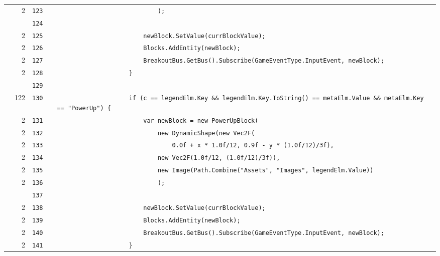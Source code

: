 \documentclass[a4paper,landscape,10pt]{article}
\begin{document}
\begin{longtable}[l]{lrrll}
\cellcolor{green} & 2 & \verb~123~ & & \verb~                            );~\\
\cellcolor{gray} &  & \verb~124~ & & \verb~~\\
\cellcolor{green} & 2 & \verb~125~ & & \verb~                        newBlock.SetValue(currBlockValue);~\\
\cellcolor{green} & 2 & \verb~126~ & & \verb~                        Blocks.AddEntity(newBlock);~\\
\cellcolor{green} & 2 & \verb~127~ & & \verb~                        BreakoutBus.GetBus().Subscribe(GameEventType.InputEvent, newBlock);~\\
\cellcolor{green} & 2 & \verb~128~ & & \verb~                    }~\\
\cellcolor{gray} &  & \verb~129~ & & \verb~~\\
\cellcolor{green} & 122 & \verb~130~ & & \verb~                    if (c == legendElm.Key && legendElm.Key.ToString() == metaElm.Value && metaElm.Key == "PowerUp") {~\\
\cellcolor{green} & 2 & \verb~131~ & & \verb~                        var newBlock = new PowerUpBlock(~\\
\cellcolor{green} & 2 & \verb~132~ & & \verb~                            new DynamicShape(new Vec2F(~\\
\cellcolor{green} & 2 & \verb~133~ & & \verb~                                0.0f + x * 1.0f/12, 0.9f - y * (1.0f/12)/3f),~\\
\cellcolor{green} & 2 & \verb~134~ & & \verb~                            new Vec2F(1.0f/12, (1.0f/12)/3f)),~\\
\cellcolor{green} & 2 & \verb~135~ & & \verb~                            new Image(Path.Combine("Assets", "Images", legendElm.Value))~\\
\cellcolor{green} & 2 & \verb~136~ & & \verb~                            );~\\
\cellcolor{gray} &  & \verb~137~ & & \verb~~\\
\cellcolor{green} & 2 & \verb~138~ & & \verb~                        newBlock.SetValue(currBlockValue);~\\
\cellcolor{green} & 2 & \verb~139~ & & \verb~                        Blocks.AddEntity(newBlock);~\\
\cellcolor{green} & 2 & \verb~140~ & & \verb~                        BreakoutBus.GetBus().Subscribe(GameEventType.InputEvent, newBlock);~\\
\cellcolor{green} & 2 & \verb~141~ & & \verb~                    }~\\

\end{longtable}
\end{document}
